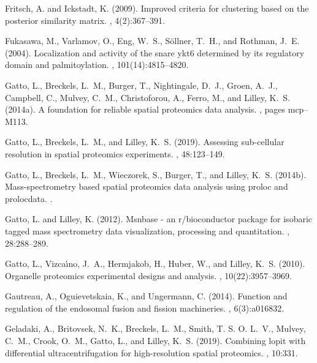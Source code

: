 \documentclass[12pt,english]{article}
\begin{document}
\begin{thebibliography}{}
Fritsch, A. and Ickstadt, K. (2009).
\newblock Improved criteria for clustering based on the posterior similarity
  matrix.
, 4(2):367--391.

Fukasawa, M., Varlamov, O., Eng, W.~S., S{\"o}llner, T.~H., and Rothman, J.~E.
  (2004).
\newblock Localization and activity of the snare ykt6 determined by its
  regulatory domain and palmitoylation.
,
  101(14):4815--4820.

Gatto, L., Breckels, L.~M., Burger, T., Nightingale, D.~J., Groen, A.~J.,
  Campbell, C., Mulvey, C.~M., Christoforou, A., Ferro, M., and Lilley, K.~S.
  (2014a).
\newblock A foundation for reliable spatial proteomics data analysis.
, pages mcp--M113.

Gatto, L., Breckels, L.~M., and Lilley, K.~S. (2019).
\newblock Assessing sub-cellular resolution in spatial proteomics experiments.
, 48:123--149.

Gatto, L., Breckels, L.~M., Wieczorek, S., Burger, T., and Lilley, K.~S.
  (2014b).
\newblock Mass-spectrometry based spatial proteomics data analysis using proloc
  and prolocdata.
.

Gatto, L. and Lilley, K. (2012).
\newblock Msnbase - an r/bioconductor package for isobaric tagged mass
  spectrometry data visualization, processing and quantitation.
, 28:288--289.

Gatto, L., Vizca{\'\i}no, J.~A., Hermjakob, H., Huber, W., and Lilley, K.~S.
  (2010).
\newblock Organelle proteomics experimental designs and analysis.
, 10(22):3957--3969.

Gautreau, A., Oguievetskaia, K., and Ungermann, C. (2014).
\newblock Function and regulation of the endosomal fusion and fission
  machineries.
, 6(3):a016832.

Geladaki, A., Britovsek, N.~K., Breckels, L.~M., Smith, T. S. O. L.~V., Mulvey,
  C.~M., Crook, O.~M., Gatto, L., and Lilley, K.~S. (2019).
\newblock Combining lopit with differential ultracentrifugation for
  high-resolution spatial proteomics.
, 10:331.


\end{thebibliography}
\end{document}
